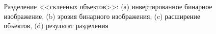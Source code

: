 \begin{figure}[ht!]
\begin{subfigure}{0.4\textwidth}
        \caption{}
        \label{img:result_circles}
    \end{subfigure}
    \caption{Разделение <<склееных объектов>>: (а) инвертированное бинарное изображение, (b) эрозия бинарного изображения, (c) расширение объектов, (d) результат разделения}
    \label{img:Cirlces}
\end{figure}
